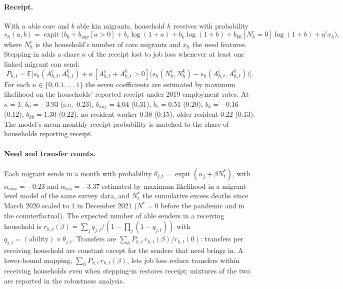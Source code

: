 \documentclass[11pt]{article}
\newcommand{\expit}{\operatorname{expit}}
\begin{document}
\paragraph{Receipt.} With $a$ able core and $b$ able kin migrants, household $h$ receives with probability
\begin{equation}
s_h(a,b) = \expit\big(b_0 + b_{\mathrm{any}}[a > 0] + b_c \log(1+a) + b_k \log(1+b) + b_{k0}[N^c_h = 0]\log(1+b) + \eta' x_h\big),
\end{equation}
where $N^c_h$ is the household's number of core migrants and $x_h$ the need features. Stepping-in adds a share $\kappa$ of the receipt lost to job loss whenever at least one linked migrant can send:
\begin{equation}
P_{h,t} = \mathbb{E}\Big[s_h(A^c_{h,t}, A^k_{h,t}) + \kappa\,[A^c_{h,t} + A^k_{h,t} > 0]\big(s_h(N^c_h, N^k_h) - s_h(A^c_{h,t}, A^k_{h,t})\big)\Big].
\end{equation}
For each $\kappa \in \{0, 0.1, \dots, 1\}$ the seven coefficients are estimated by maximum likelihood on the households' reported receipt under 2019 employment rates. At $\kappa = 1$: $b_0 = -3.93$ (s.e.\ 0.23), $b_{\mathrm{any}} = 4.04$ (0.31), $b_c = 0.51$ (0.20), $b_k = -0.16$ (0.12), $b_{k0} = 1.30$ (0.22), no resident worker 0.38 (0.15), older resident 0.22 (0.13). The model's mean monthly receipt probability is matched to the share of households reporting receipt.

\paragraph{Need and transfer counts.} Each migrant sends in a month with probability $\theta_{j,t} = \expit(\alpha_j + \beta N^*_t)$, with $\alpha_{\mathrm{core}} = -0.23$ and $\alpha_{\mathrm{kin}} = -3.37$ estimated by maximum likelihood in a migrant-level model of the same survey data, and $N^*_t$ the cumulative excess deaths since March 2020 scaled to 1 in December 2021 ($N^* = 0$ before the pandemic and in the counterfactual). The expected number of able senders in a receiving household is $r_{h,t}(\beta) = \sum_j q_{j,t} / (1 - \prod_j (1 - q_{j,t}))$ with $q_{j,t} = (\text{ability}) \times \theta_{j,t}$. Transfers are $\sum_h P_{h,t}\, r_{h,t}(\beta)/r_{h,t}(0)$: transfers per receiving household are constant except for the senders that need brings in. A lower-bound mapping, $\sum_h P_{h,t}\, r_{h,t}(\beta)$, lets job loss reduce transfers within receiving households even when stepping-in restores receipt; mixtures of the two are reported in the robustness analysis.
\end{document}
